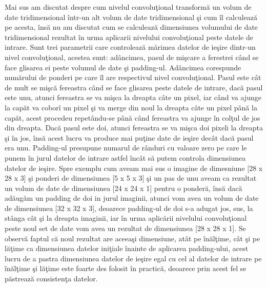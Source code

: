 \par

Mai sus am discutat despre cum nivelul convolu\c{t}ional transform\u{a} un volum de date tridimensional \^{i}ntr-un alt volum de date tridimensional \c{s}i cum \^{i}l calculeaz\u{a} pe acesta, \^{i}ns\u{a} nu am discutat cum se calculeaz\u{a} dimensiunea volumului de date tridimensional rezultat \^{i}n urma aplicarii nivelului convolu\c{t}ional peste  datele de intrare. Sunt trei parametrii care controleaz\u{a} m\u{a}rimea datelor de ie\c{s}ire dintr-un nivel convolu\c{t}ional, acestea sunt: ad\^{a}ncimea, pasul de mi\c{s}care a ferestrei c\^{a}nd se face glisarea ei peste volumul de date \c{s}i padding-ul. Ad\^{a}ncimea corespunde num\u{a}rului de ponderi pe care \^{i}l are respectivul nivel convolu\c{t}ional. Pasul este c\^{a}t de mult se mi\c{s}c\u{a} fereastra c\^{a}nd se face glisarea peste datele de intrare, dac\u{a} pasul este unu, atunci fereastra se va mi\c{s}ca la dreapta c\^{a}te un pixel, iar c\^{a}nd va ajunge la cap\u{a}t va cobor\^{i} un pixel \c{s}i va merge din noul la dreapta c\^{a}te un pixel p\^{a}n\u{a} la cap\u{a}t, acest procedeu repet\^{a}ndu-se p\^{a}n\u{a} c\^{a}nd fereastra va ajunge \^{i}n col\c{t}ul de jos din dreapta. Dac\u{a} pasul este doi, atunci fereastra se va mi\c{s}ca doi pixeli la dreapta \c{s}i \^{i}n jos, \^{i}ns\u{a} acest lucru va produce mai pu\c{t}ine date de ie\c{s}ire dec\^{a}t dac\u{a} pasul era unu. Padding-ul presupune numarul de r\^{a}nduri cu valoare zero pe care le punem \^{i}n jurul datelor de intrare astfel \^{i}nc\^{a}t s\u{a} putem controla dimensiunea datelor de ie\c{s}ire. Spre exemplu cum aveam mai sus o imagine de dimesniune [28 x 28 x 3] \c{s}i ponderi de dimensiunea [5 x 5 x 3] \c{s}i un pas de unu aveam ca rezultat un volum de date de dimensiunea [24 x 24 x 1] pentru o ponder\u{a}, \^{i}ns\u{a} dac\u{a} ad\u{a}ug\u{a}m un padding de doi in jurul imaginii, atunci vom avea un volum de date de dimensiunea [32 x 32 x 3], deoarece padding-ul de doi s-a adugat jos, sus, la st\^{a}nga c\^{a}t \c{s}i la dreapta imaginii, iar \^{i}n urma aplic\u{a}rii nivelului convolu\c{t}ional peste noul set de date vom avea un rezultat de dimensiunea [28 x 28 x 1]. Se observ\u{a} faptul c\u{a} noul rezultat are aceea\c{s}i dimensiune, at\^{a}t pe \^{i}n\u{a}l\c{t}ime, c\^{a}t \c{s}i pe l\u{a}\c{t}ime ca dimensiunea datelor ini\c{t}iale \^{i}nainte de aplicarea padding-ului, acest lucru  de a pastra dimensiunea datelor de ie\c{s}ire egal cu cel al datelor de intrare pe \^{i}n\u{a}l\c{t}ime \c{s}i l\u{a}\c{t}ime este foarte des folosit \^{i}n practic\u{a}, deoarece prin acest fel se p\u{a}streaz\u{a} consisten\c{t}a datelor.

